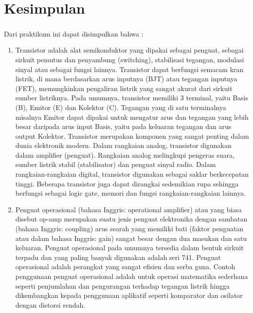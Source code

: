\documentclass[12pt,a4paper]{article}
\begin{document}
\section{Kesimpulan}
\subparagraph{ }
Dari praktikum ini dapat disimpulkan bahwa :
\begin{enumerate}

\item Transistor adalah alat semikonduktor yang dipakai sebagai penguat, sebagai sirkuit pemutus dan penyambung (switching), stabilisasi tegangan, modulasi sinyal atau sebagai fungsi lainnya. Transistor dapat berfungsi semacam kran listrik, di mana berdasarkan arus inputnya (BJT) atau tegangan inputnya (FET), memungkinkan pengaliran listrik yang sangat akurat dari sirkuit sumber listriknya. Pada umumnya, transistor memiliki 3 terminal, yaitu Basis (B), Emitor (E) dan Kolektor (C). Tegangan yang di satu terminalnya misalnya Emitor dapat dipakai untuk mengatur arus dan tegangan yang lebih besar daripada arus input Basis, yaitu pada keluaran tegangan dan arus output Kolektor. Transistor merupakan komponen yang sangat penting dalam dunia elektronik modern. Dalam rangkaian analog, transistor digunakan dalam amplifier (penguat). Rangkaian analog melingkupi pengeras suara, sumber listrik stabil (stabilisator) dan penguat sinyal radio. Dalam rangkaian-rangkaian digital, transistor digunakan sebagai saklar berkecepatan tinggi. Beberapa transistor juga dapat dirangkai sedemikian rupa sehingga berfungsi sebagai logic gate, memori dan fungsi rangkaian-rangkaian lainnya.

\item Penguat operasional (bahasa Inggris: operational amplifier) atau yang biasa disebut op-amp merupakan suatu jenis penguat elektronika dengan sambatan (bahasa Inggris: coupling) arus searah yang memiliki bati (faktor penguatan atau dalam bahasa Inggris: gain) sangat besar dengan dua masukan dan satu keluaran. Penguat operasional pada umumnya tersedia dalam bentuk sirkuit terpadu dan yang paling banyak digunakan adalah seri 741.
Penguat operasional adalah perangkat yang sangat efisien dan serba guna. Contoh penggunaan penguat operasional adalah untuk operasi matematika sederhana seperti penjumlahan dan pengurangan terhadap tegangan listrik hingga dikembangkan kepada penggunaan aplikatif seperti komparator dan osilator dengan distorsi rendah.


\end{enumerate}
\end{document}
